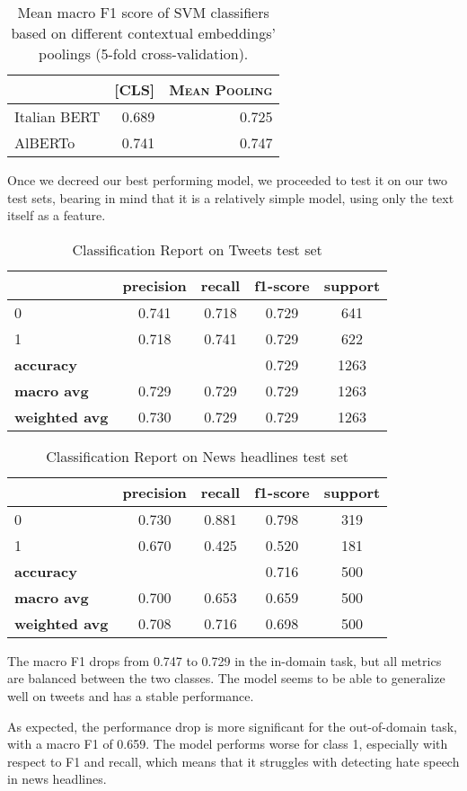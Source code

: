 \begin{table}
\centering
    \begin{tabular}{lrr}
        \toprule
        & \textsc{[CLS]} & \textsc{Mean Pooling} \\
        \midrule
        Italian BERT & 0.689 & 0.725 \\
        AlBERTo & 0.741 & 0.747 \\
        \bottomrule
    \end{tabular}
    \caption{Mean macro F1 score of SVM classifiers based on different contextual embeddings' poolings (5-fold cross-validation).}
    \label{tbl:svm_f1_contextual_embs_pooling}
\end{table}

Once we decreed our best performing model, we proceeded to test it on our two test sets, bearing in mind that it is a relatively simple model, using only the text itself as a feature.

\begin{table}[h]
    \small
    \centering
    \begin{tabular}{lcccc}
        \toprule
        & \textbf{precision} & \textbf{recall} & \textbf{f1-score} & \textbf{support} \\
        \midrule
        0 & 0.741 & 0.718 & 0.729 & 641 \\
        1 & 0.718 & 0.741 & 0.729 & 622 \\
        \midrule
        \textbf{accuracy} & & & 0.729 & 1263 \\
        \textbf{macro avg} & 0.729 & 0.729 & 0.729 & 1263 \\
        \textbf{weighted avg} & 0.730 & 0.729 & 0.729 & 1263 \\
        \bottomrule
    \end{tabular}
    \caption{Classification Report on Tweets test set}
    \label{tab:classification_report_svm_alberto_tweets}
\end{table}

\begin{table}[h]
    \small
    \centering
    \begin{tabular}{lcccc}
        \toprule
        & \textbf{precision} & \textbf{recall} & \textbf{f1-score} & \textbf{support} \\
        \midrule
        0 & 0.730 & 0.881 & 0.798 & 319 \\
        1 & 0.670 & 0.425 & 0.520 & 181 \\
        \midrule
        \textbf{accuracy} & & & 0.716 & 500 \\
        \textbf{macro avg} & 0.700 & 0.653 & 0.659 & 500 \\
        \textbf{weighted avg} & 0.708 & 0.716 & 0.698 & 500 \\
        \bottomrule
    \end{tabular}
    \caption{Classification Report on News headlines test set}
    \label{tab:classification_report_svm_alberto_news}
\end{table}
The macro F1 drops from 0.747 to 0.729 in the in-domain task, but all metrics are balanced between the two classes. The model seems to be able to generalize well on tweets and has a stable performance.

As expected, the performance drop is more significant for the out-of-domain task, with a macro F1 of 0.659. The model performs worse for class 1, especially with respect to F1 and recall, which means that it struggles with detecting hate speech in news headlines.
